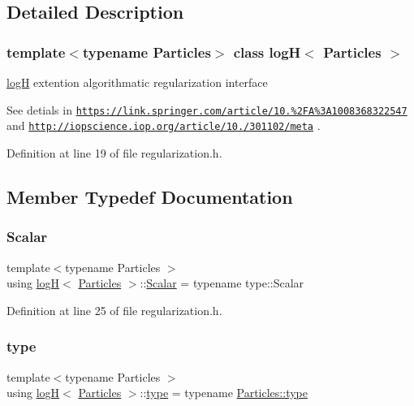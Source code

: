 \subsection{Detailed Description}
\subsubsection*{template$<$typename Particles$>$\newline
class log\+H$<$ Particles $>$}

\mbox{\hyperlink{classlog_h}{logH}} extention algorithmatic regularization interface 

See detials in \href{https://link.springer.com/article/10.1023%2FA%3A1008368322547}{\tt https\+://link.\+springer.\+com/article/10.\+1023\%2\+F\+A\%3\+A1008368322547} and \href{http://iopscience.iop.org/article/10.1086/301102/meta}{\tt http\+://iopscience.\+iop.\+org/article/10.\+1086/301102/meta} . 

Definition at line 19 of file regularization.\+h.



\subsection{Member Typedef Documentation}
\mbox{\label{classlog_h_a2235c75eff5d2e299c8ce4b2c02f8801}} 
\subsubsection{\texorpdfstring{Scalar}{Scalar}}
{\footnotesize\ttfamily template$<$typename Particles $>$ \\
using \mbox{\hyperlink{classlog_h}{logH}}$<$ \mbox{\hyperlink{struct_particles}{Particles}} $>$\+::\mbox{\hyperlink{classlog_h_a2235c75eff5d2e299c8ce4b2c02f8801}{Scalar}} =  typename type\+::\+Scalar}



Definition at line 25 of file regularization.\+h.

\mbox{\label{classlog_h_aa902eaf1133d9ef2cd15713d81619240}} 
\subsubsection{\texorpdfstring{type}{type}}
{\footnotesize\ttfamily template$<$typename Particles $>$ \\
using \mbox{\hyperlink{classlog_h}{logH}}$<$ \mbox{\hyperlink{struct_particles}{Particles}} $>$\+::\mbox{\hyperlink{classlog_h_aa902eaf1133d9ef2cd15713d81619240}{type}} =  typename \mbox{\hyperlink{class_vel_indep_particles_a0c62b43c2f0a50565e5e06587fddee18}{Particles\+::type}}}



